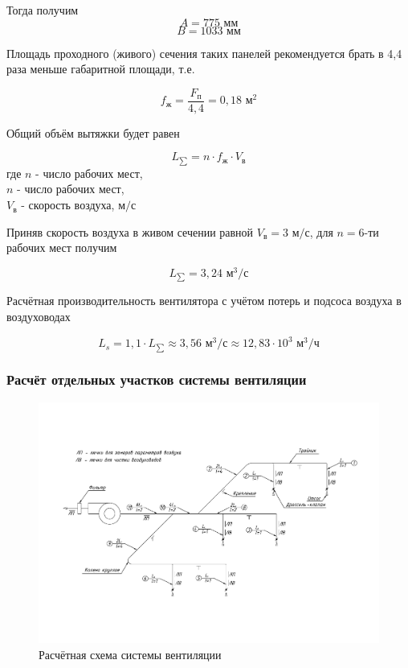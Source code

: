 Тогда получим
$$
    A = 775 \text{ мм}
$$
$$
    B = 1033 \text{ мм}
$$

Площадь проходного (живого) сечения таких панелей рекомендуется брать в 4,4
раза меньше габаритной площади, т.е.

\begin{equation}
\label{alive_section_are}
    f_\text{ж} = \frac{F_\text{п}}{4,4} = 0,18 \text{ м}^2
\end{equation}

Общий объём вытяжки будет равен

\begin{equation}
\label{overall_sucktion_volume}
    L_{\sum} = n \cdot f_\text{ж} \cdot V_\text{в}
\end{equation}
где $n$ - число рабочих мест,                   \\
$n$ - число рабочих мест,                       \\
$V_\text{в}$ - скорость воздуха, $\text{м/с}$

Приняв скорость воздуха в живом сечении равной $V_\text{в} = 3 \text{ м/с}$,
для $n = 6$-ти рабочих мест получим

$$
    L_{\sum} = 3,24 \text{ м}^3 / \text{с}
$$

Расчётная производительность вентилятора с учётом потерь и подсоса воздуха
в воздуховодах

\begin{equation}
\label{fan_productivity}
    L_s = 1,1 \cdot L_{\sum}
        \approx 3,56 \text{ м}^3 / \text{с}
        \approx 12,83 \cdot 10^3 \text{ м}^3 / \text{ч}
\end{equation}

\subsubsection{Расчёт отдельных участков системы вентиляции}

\begin{figure}[ht]
    \centering
    \includegraphics[width=\textwidth, keepaspectratio, clip=true, trim=0mm 35mm 0mm 40mm]
                    {./src/ecology/pictures/vent_system_arrangement}
    \caption{Расчётная схема системы вентиляции}
    \label{pic_vent_system_arrangement}
\end{figure}


